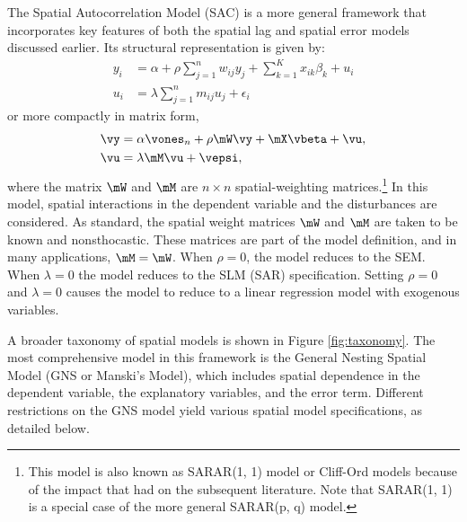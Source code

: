 \documentclass[english,12pt]{book}\usepackage[]{graphicx}\usepackage[]{xcolor}
\begin{document}
The Spatial Autocorrelation Model (SAC) is a more general framework that incorporates key features of both the spatial lag and spatial error models discussed earlier. Its structural representation is given by:
\begin{equation*}
  \begin{aligned}
    y_i & = \alpha + \rho    \sum_{j = 1}^n w_{ij} y_j + \sum_{k=1}^K x_{ik}\beta_k + u_i \\
    u_i & = \lambda \sum_{j = 1}^n m_{ij} u_j + \epsilon_i
  \end{aligned}
\end{equation*}
%
or more compactly in matrix form, 
\begin{equation*}
  \begin{aligned}
\vy &= \alpha \vones_n + \rho \mW\vy + \mX\vbeta + \vu, \\
\vu &= \lambda \mM\vu + \vepsi, \\
  \end{aligned}
\end{equation*}
%
where the matrix $\mW$ and $\mM$ are $n\times n$ spatial-weighting matrices.\footnote{This model is also known as SARAR(1, 1) model or Cliff-Ord models because of the impact that \cite{cliff1973spatial}  had on the subsequent literature. Note that SARAR(1, 1) is  a special case of the more general SARAR(p, q) model.} In this model, spatial interactions in the dependent variable and the disturbances are considered. As standard, the spatial weight matrices $\mW$ and $\mM$ are taken to be known and nonsthocastic. These matrices are part of the model definition, and in many applications, $\mM = \mW$. When $\rho = 0$, the model reduces to the SEM. When $\lambda = 0$ the model reduces to the SLM (SAR) specification. Setting $\rho = 0$ and $\lambda = 0$ causes the model to reduce to a linear regression model with exogenous variables. 

A broader taxonomy of spatial models is shown in Figure \ref{fig:taxonomy}. The most comprehensive model in this framework is the General Nesting Spatial Model (GNS or Manski's Model), which includes spatial dependence in the dependent variable, the explanatory variables, and the error term. Different restrictions on the GNS model yield various spatial model specifications, as detailed below.
\end{document}
